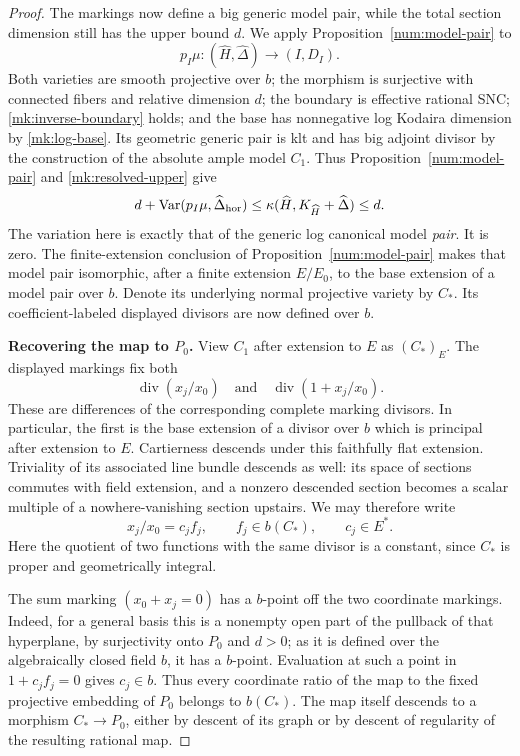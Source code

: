 \begin{proof}
The markings now define a big generic model pair, while the total
section dimension still has the upper bound $d$. We apply
Proposition~\ref{num:model-pair} to
\[
 p_I\mu:(\widehat H,\widehat\Delta)\longrightarrow(I,D_I).
\]
Both varieties are smooth projective over $b$; the morphism is
surjective with connected fibers and relative dimension $d$; the
boundary is effective rational SNC; \eqref{mk:inverse-boundary} holds;
and the base has nonnegative log Kodaira dimension by
\eqref{mk:log-base}.  Its geometric generic pair is klt and has big
adjoint divisor by the construction of the absolute ample model $C_1$.
Thus Proposition~\ref{num:model-pair} and \eqref{mk:resolved-upper} give
\[
 d+\operatorname{Var}(p_I\mu,\widehat\Delta_{\mathrm{hor}})
 \leq\kappa(\widehat H,K_{\widehat H}+\widehat\Delta)\leq d.
\]
The variation here is exactly that of the generic log canonical model
\emph{pair}. It is zero. The finite-extension conclusion of
Proposition~\ref{num:model-pair} makes that model pair isomorphic, after a finite
extension $E/E_0$, to the base extension of a model pair over $b$.
Denote its underlying normal projective variety by $C_*$.  Its
coefficient-labeled displayed divisors are now defined over $b$.

\smallskip\noindent\textbf{Recovering the map to $P_0$.}\enspace
View $C_1$ after extension to $E$ as $(C_*)_E$.  The displayed markings
fix both
\[
 \operatorname{div}(x_j/x_0)
 \quad\text{and}\quad
 \operatorname{div}(1+x_j/x_0).
\]
These are differences of the corresponding complete marking divisors.
In particular, the first is the base extension of a divisor over $b$
which is principal after extension to $E$.  Cartierness descends under
this faithfully flat extension.  Triviality of its associated line
bundle descends as well: its space of sections commutes with field
extension, and a nonzero descended section becomes a scalar multiple
of a nowhere-vanishing section upstairs.  We may therefore write
\begin{equation}\label{mk:coordinate-functions}
 x_j/x_0=c_jf_j,
 \qquad f_j\in b(C_*),\qquad c_j\in E^*.
\end{equation}
Here the quotient of two functions with the same divisor is a constant,
since $C_*$ is proper and geometrically integral.

The sum marking $(x_0+x_j=0)$ has a $b$-point off the two coordinate
markings.  Indeed, for a general basis this is a nonempty open part of
the pullback of that hyperplane, by surjectivity onto $P_0$ and $d>0$;
as it is defined over the algebraically closed field $b$, it has a
$b$-point.  Evaluation at such a point in
$1+c_jf_j=0$ gives $c_j\in b$.  Thus every coordinate ratio of the
map to the fixed projective embedding of $P_0$ belongs to $b(C_*)$.
The map itself descends to a morphism $C_*\to P_0$, either by descent
of its graph or by descent of regularity of the resulting rational
map.


\end{proof}
